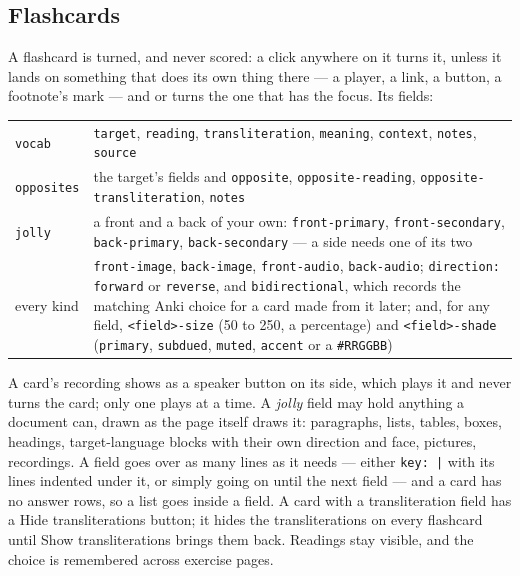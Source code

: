 \documentclass[11pt,oneside]{report}
\newcommand{\key}[1]{\textsf{\small\fbox{#1}}}
\newcommand{\menu}[1]{\textsf{#1}}
\begin{document}
\subsection*{Flashcards}

A flashcard is turned, and never scored: a click anywhere on it turns it,
unless it lands on something that does its own thing there --- a player, a
link, a button, a footnote's mark --- and \key{Enter} or \key{Space} turns
the one that has the focus. Its fields:

\begin{center}
\small
\begin{longtable}{@{}>{\raggedright\arraybackslash}p{}>{\raggedright\arraybackslash}p{}@{}}
\toprule
\texttt{vocab} & \texttt{target}, \texttt{reading}, \texttt{transliteration},
  \texttt{meaning}, \texttt{context}, \texttt{notes}, \texttt{source} \\
\addlinespace
\texttt{opposites} & the target's fields and \texttt{opposite},
  \texttt{opposite-reading}, \texttt{opposite-transliteration},
  \texttt{notes} \\
\addlinespace
\texttt{jolly} & a front and a back of your own: \texttt{front-primary},
  \texttt{front-secondary}, \texttt{back-primary},
  \texttt{back-secondary} --- a side needs one of its two \\
\addlinespace
every kind & \texttt{front-image}, \texttt{back-image},
  \texttt{front-audio}, \texttt{back-audio}; \texttt{direction:}
  \texttt{forward} or \texttt{reverse}, and \texttt{bidirectional}, which
  records the matching Anki choice for a card made from it later; and, for
  any field, \texttt{<field>-size} (50 to 250, a percentage) and
  \texttt{<field>-shade} (\texttt{primary}, \texttt{subdued}, \texttt{muted},
  \texttt{accent} or a \texttt{\#RRGGBB}) \\
\bottomrule
\end{longtable}
\end{center}

\noindent A card's recording shows as a speaker button on its side, which
plays it and never turns the card; only one plays at a time. A \emph{jolly}
field may hold anything a document can, drawn as the page itself draws it:
paragraphs, lists, tables, boxes, headings, target-language blocks with their
own direction and face, pictures, recordings. A field goes over as many lines
as it needs --- either \texttt{key: |} with its lines indented under it, or
simply going on until the next field --- and a card has no answer rows, so a
list goes inside a field. A card with a transliteration field has a
\menu{Hide transliterations} button; it hides the transliterations on every
flashcard until \menu{Show transliterations} brings them back. Readings stay
visible, and the choice is remembered across exercise pages.
\end{document}
